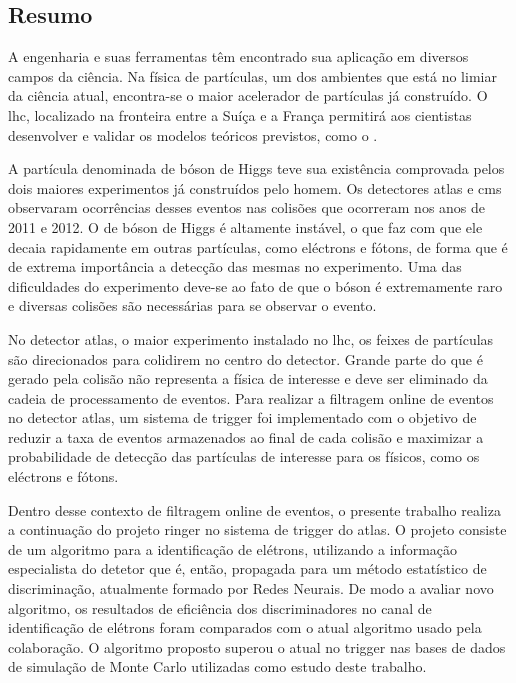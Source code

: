 \vfill
\begin{center}
\section*{Resumo\label{Resumo}}
\end{center}

A engenharia e suas ferramentas têm encontrado sua aplicação em diversos campos da ciência.
Na física de partículas, um dos ambientes que está no limiar da ciência atual, encontra-se
o maior acelerador de partículas já construído. O \acrshort{lhc}, localizado na fronteira 
entre a Suíça e a França permitirá aos cientistas desenvolver e validar os modelos teóricos 
previstos, como o .

A partícula denominada de bóson de Higgs teve sua existência comprovada pelos dois maiores
experimentos já construídos pelo homem. Os detectores \acrshort{atlas} e \acrshort{cms} observaram 
ocorrências desses eventos nas colisões que ocorreram nos anos de 2011 e 2012. O de bóson de Higgs 
é altamente instável, o que faz com que ele decaia rapidamente em outras partículas, 
como eléctrons e  fótons, de forma que é de extrema importância a detecção das mesmas no experimento. 
Uma das dificuldades do experimento deve-se ao fato de que o bóson é extremamente raro e diversas colisões são 
necessárias para se observar o evento.

No detector \acrshort{atlas}, o maior experimento instalado no \acrshort{lhc}, os feixes de partículas
são direcionados para colidirem no centro do detector. Grande parte do que é gerado
pela colisão não representa a física de interesse e deve ser eliminado da cadeia de processamento 
de eventos. Para realizar a filtragem online de eventos no detector \acrshort{atlas}, um sistema de trigger 
foi implementado com o objetivo de reduzir a taxa de eventos armazenados ao final de cada colisão e maximizar
a probabilidade de detecção das partículas de interesse para os físicos, como os eléctrons e fótons.

Dentro desse contexto de filtragem online de eventos, o presente trabalho realiza a continuação do projeto
\acrshort{ringer} no sistema de \acrshort{trigger} do \acrshort{atlas}. O projeto consiste de um algoritmo para 
a identificação de elétrons, utilizando a informação especialista do detetor que é, então, propagada para um 
método estatístico de discriminação, atualmente formado por Redes Neurais. De modo a avaliar novo algoritmo, os 
resultados de eficiência dos discriminadores no canal de identificação de elétrons foram 
comparados com o atual algoritmo usado pela colaboração. O algoritmo proposto superou o atual no trigger nas 
bases de dados de simulação de Monte Carlo utilizadas como estudo deste trabalho.

